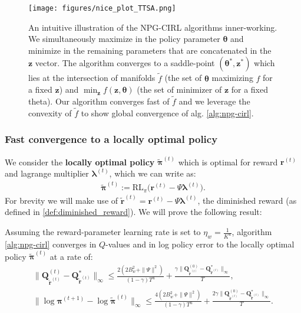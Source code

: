 \begin{figure}[h!]
    \centering
    \texttt{[image: figures/nice\_plot\_TTSA.png]}
    \caption{An intuitive illustration of the NPG-CIRL algorithms inner-working. We simultaneously maximize in the policy parameter $\bm{\theta}$ and minimize in the remaining parameters that are concatenated in the $\bm{z}$ vector. The algorithm converges to a saddle-point $(\bm{\theta}^*,\bm{z}^*)$ which lies at the intersection of manifolds $\tilde{f}$ (the set of $\bm{\theta}$ maximizing $f$ for a fixed $\bm{z}$) and $\min_{\bm{z}}f(\bm{z},\bm{\theta})$ (the set of minimizer of $\bm{z}$ for a fixed theta). Our algorithm converges fast of $\tilde{{f}}$ and we leverage the convexity of $\tilde{f}$ to show global convergence of alg. \ref{alg:npg-cirl}.}
\end{figure}

\subsubsection{Fast convergence to a locally optimal policy}
\label{sec:NPG_CIRL_fast_conv_local_optimal}

We consider the \textbf{locally optimal policy} $\tilde{\bm{\pi}}^{(t)}$ which is optimal for reward $\bm{r}^{(t)}$ and lagrange multiplier $\bm{\lambda}^{(t)}$, which we can write as:
\begin{align*}
    \tilde{\bm{\pi}}^{(t)} := \text{RL}_\pi \bigl( \bm{r}^{(t)} - \Psi \bm{\lambda}^{(t)} \bigr).
\end{align*}
For brevity we will make use of $\tilde{\bm{r}}^{(t)} = \bm{r}^{(t)} - \Psi \bm{\lambda}^{(t)}$, the diminished reward (as defined in \ref{def:diminished_reward}). We will prove the following result:

\begin{lemma}
    \label{lemma:policy_converges_to_local_opt}
    Assuming the reward-parameter learning rate is set to $\eta_w = \frac{1}{K^u}$, algorithm \ref{alg:npg-cirl} converges in $Q$-values and in log policy error to the locally optimal policy $\tilde{\bm{\pi}}^{(t)}$ at a rate of:
    \begin{align*}
            \|\bm{Q}^{(t)}_{\tilde{\bm{r}}^{(t)}}
        - \bm{Q}^*_{\tilde{\bm{r}}^{(t)}} \|_\infty 
        \leq
        \frac{2(2 B_w^2+\|\Psi\|^2)}{(1 - \gamma)T^u}
        +
        \frac{\gamma 
        \|\bm{Q}^{(0)}_{\tilde{\bm{r}}^{(t)}}
        - \bm{Q}^*_{\tilde{\bm{r}}^{(t)}} \|_\infty
        }{T},\\
        \| \log \bm{\pi}^{(t+1)} - \log \tilde{\bm{\pi}}^{(t)} \|_\infty 
        \leq
        \frac{4(2 B_w^2+\|\Psi\|^2)}{(1 - \gamma)T^u} +
        \frac{2 \gamma 
        \|\bm{Q}^{(0)}_{\tilde{\bm{r}}^{(t)}}
        - \bm{Q}^*_{\tilde{\bm{r}}^{(t)}} \|_\infty
        }{T}.
    \end{align*}
\end{lemma}

